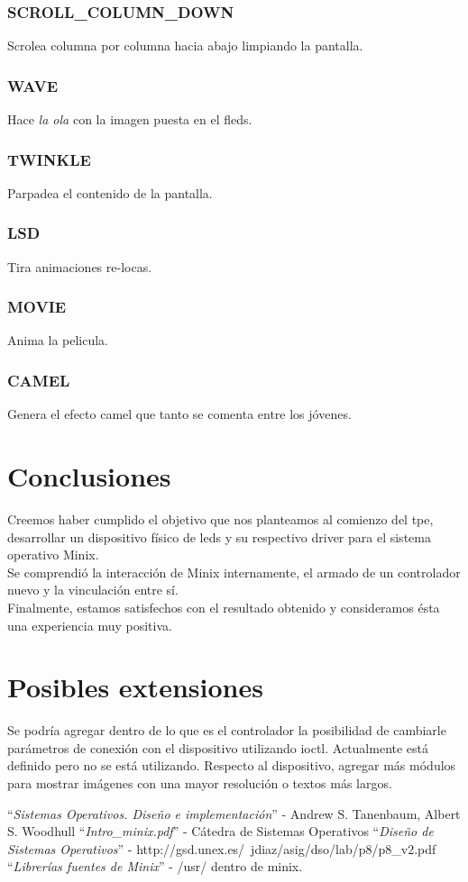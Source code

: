 \documentclass[a4paper,11pt,epsf]{article}
\begin{document}
\subsubsection{SCROLL\_COLUMN\_DOWN}
Scrolea columna por columna hacia abajo limpiando la pantalla.
\subsubsection{WAVE}
Hace \emph{la ola} con la imagen puesta en el fleds.
\subsubsection{TWINKLE}
Parpadea el contenido de la pantalla.
\subsubsection{LSD}
Tira animaciones re-locas.
\subsubsection{MOVIE}
Anima la pelicula.
\subsubsection{CAMEL}
Genera el efecto camel que tanto se comenta entre los j\'ovenes.
\section{Conclusiones} 
Creemos haber cumplido el objetivo que nos planteamos al comienzo del tpe, desarrollar un dispositivo f\'isico de leds y su respectivo driver para el sistema operativo Minix.\\
Se comprendi\'o la interacci\'on de Minix internamente, el armado de un controlador nuevo y la vinculaci\'on entre s\'i.\\
Finalmente, estamos satisfechos con el resultado obtenido y consideramos \'esta una experiencia muy positiva.

\section{Posibles extensiones} 
Se podr\'ia agregar dentro de lo que es el controlador la posibilidad de cambiarle par\'ametros de conexi\'on con el dispositivo utilizando ioctl. Actualmente est\'a definido pero no se est\'a utilizando. Respecto al dispositivo, agregar m\'as m\'odulos para mostrar im\'agenes con una mayor resoluci\'on o textos m\'as largos.

\begin{thebibliography}{10}

 ``\textit{Sistemas Operativos. Dise\~no e implementaci\'on}'' - Andrew S. Tanenbaum, Albert S. Woodhull
 ``\textit{Intro\_minix.pdf}'' - C\'atedra de Sistemas Operativos
 ``\textit{Dise\~no de Sistemas Operativos}'' - http://gsd.unex.es/~jdiaz/asig/dso/lab/p8/p8\_v2.pdf
 ``\textit{Librer\'ias fuentes de Minix}'' - /usr/ dentro de minix.
\end{thebibliography}
\end{document}
